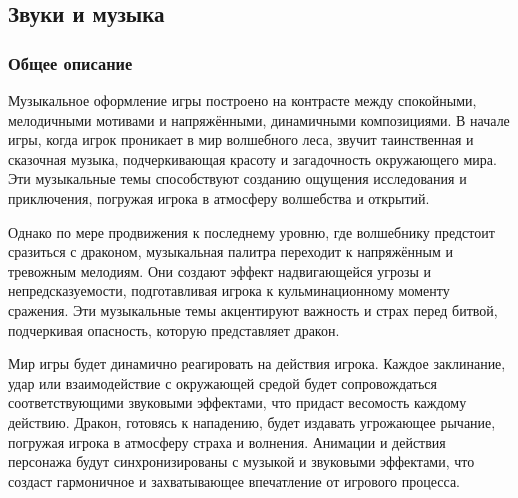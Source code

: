 \documentclass{article}
\begin{document}
\subsection{Звуки и музыка}
\subsubsection{Общее описание}
Музыкальное оформление игры построено на контрасте между спокойными, мелодичными мотивами и напряжёнными, динамичными композициями. В начале игры, когда игрок проникает в мир волшебного леса, звучит таинственная и сказочная музыка, подчеркивающая красоту и загадочность окружающего мира. Эти музыкальные темы способствуют созданию ощущения исследования и приключения, погружая игрока в атмосферу волшебства и открытий.

Однако по мере продвижения к последнему уровню, где волшебнику предстоит сразиться с драконом, музыкальная палитра переходит к напряжённым и тревожным мелодиям. Они создают эффект надвигающейся угрозы и непредсказуемости, подготавливая игрока к кульминационному моменту сражения. Эти музыкальные темы акцентируют важность и страх перед битвой, подчеркивая опасность, которую представляет дракон.

Мир игры будет динамично реагировать на действия игрока. Каждое заклинание, удар или взаимодействие с окружающей средой будет сопровождаться соответствующими звуковыми эффектами, что придаст весомость каждому действию. Дракон, готовясь к нападению, будет издавать угрожающее рычание, погружая игрока в атмосферу страха и волнения. Анимации и действия персонажа будут синхронизированы с музыкой и звуковыми эффектами, что создаст гармоничное и захватывающее впечатление от игрового процесса.
\end{document}
